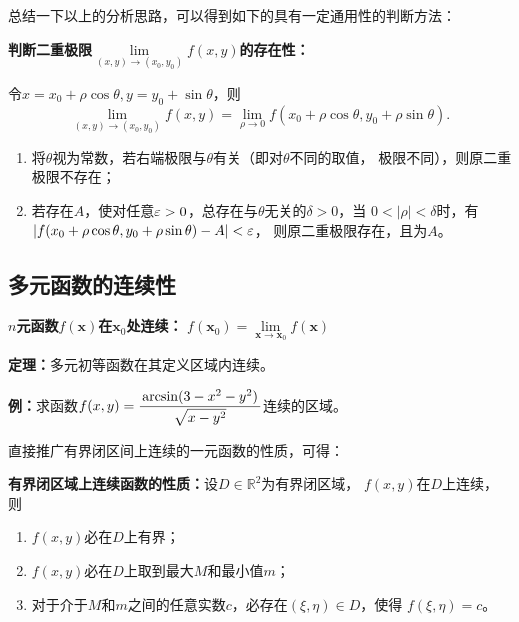 总结一下以上的分析思路，可以得到如下的具有一定通用性的判断方法：
\begin{thx}
	{\bf 判断二重极限$\lim\limits_{(x,y)\to(x_0,y_0)}f(x,y)$的存在性：}
	
	令$x=x_0+\rho\cos\theta,y=y_0+\sin\theta$，则
	$$\lim\limits_{(x,y)\to(x_0,y_0)}f(x,y)
	=\lim\limits_{\rho\to0}f(x_0+\rho\cos\theta,y_0+\rho\sin\theta).$$
	\begin{enumerate}[(1)]
	  \item 将$\theta$视为常数，若右端极限与$\theta$有关（即对$\theta$不同的取值，
	  极限不同），则原二重极限不存在；
	  \item 若存在$A$，使对任意$\varepsilon>0$，总存在与$\theta$无关的$\delta>0$，当
	  $0<|\rho|<\delta$时，有$|f(x_0+\rho\cos\theta,y_0+\rho\sin\theta)-A|<\varepsilon$，
	  则原二重极限存在，且为$A$。
	\end{enumerate}
\end{thx}

\subsection{多元函数的连续性}

\begin{thx}
	{\bf $n$元函数$f(\bm{x})$在$\bm{x}_0$处连续：}
	$f(\bm{x}_0)=\lim\limits_{\bm{x}\to\bm{x}_0}f(\bm{x})$
\end{thx}

\begin{thx}
	{\bf 定理：}多元初等函数在其定义区域内连续。
\end{thx}

{\bf 例：}求函数$f(x,y)=\displaystyle\frac{\,{\arcsin(3-x^2-y^2)}\,}{\,{\sqrt{x-y^2}}\,}$连续的区域。

直接推广有界闭区间上连续的一元函数的性质，可得：
\begin{thx}
	{\bf 有界闭区域上连续函数的性质：}设$D\in\mathbb{R}^2$为有界闭区域，
	$f(x,y)$在$D$上连续，则
	\begin{enumerate}
	  \item $f(x,y)$必在$D$上有界；
	  \item $f(x,y)$必在$D$上取到最大$M$和最小值$m$；
	  \item 对于介于$M$和$m$之间的任意实数$c$，必存在$(\xi,\eta)\in{D}$，使得
	  $f(\xi,\eta)=c$。
	\end{enumerate}
\end{thx}

